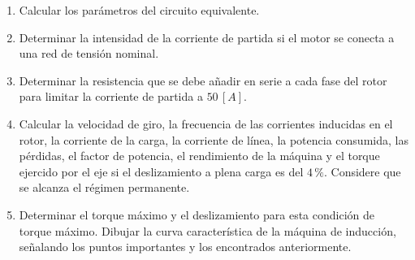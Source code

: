\documentclass[
  11pt,
  letterpaper,
   addpoints,
   answers
  ]{exam}
\begin{document}
\begin{questions}
    \begin{enumerate}
        \item Calcular los parámetros del circuito equivalente.
        \item Determinar la intensidad de la corriente de partida si el motor se conecta a una red de tensión nominal.
        \item Determinar la resistencia que se debe añadir en serie a cada fase del rotor para limitar la corriente de partida a \(50 \, [A]\).
        \item Calcular la velocidad de giro, la frecuencia de las corrientes inducidas en el rotor, la corriente de la carga, la corriente de línea, la potencia consumida, las pérdidas, el factor de potencia, el rendimiento de la máquina y el torque ejercido por el eje si el deslizamiento a plena carga es del \(4 \, \%\). Considere que se alcanza el régimen permanente.
        \item Determinar el torque máximo y el deslizamiento para esta condición de torque máximo. Dibujar la curva característica de la máquina de inducción, señalando los puntos importantes y los encontrados anteriormente.
    \end{enumerate}

    \begin{solution}

\end{solution}
\end{questions}
\end{document}
